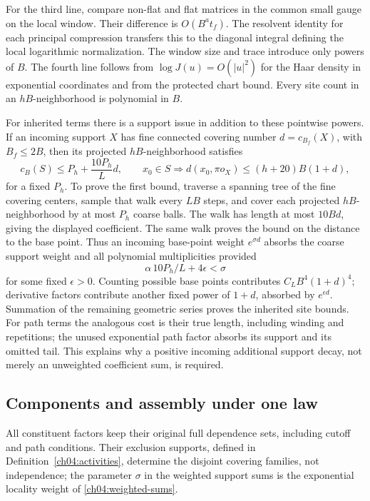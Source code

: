 For the third line, compare non-flat and flat matrices in the common
small gauge on the local window. Their difference is $O(B^a t_f)$.
The resolvent identity for each principal compression transfers this
to the diagonal integral defining the local logarithmic normalization.
The window size and trace introduce only powers of $B$.
The fourth line follows from $\log J(u)=O(|u|^2)$ for the Haar density
in exponential coordinates and from the protected chart bound.
Every site count in an $hB$-neighborhood is polynomial in $B$.

For inherited terms there is a support issue in addition to these
pointwise powers. If an incoming support $X$ has fine connected covering number
$d=c_{B_f}(X)$, with $B_f\le2B$, then its projected $hB$-neighborhood satisfies
\[
 c_B(S)\le P_h+\frac{10P_h}{L}d,\qquad
 x_0\in S\Longrightarrow
 d(x_0,\pi o_X)\le(h+20)B(1+d),
\]
for a fixed $P_h$. To prove the first bound, traverse a spanning tree
of the fine covering centers, sample that walk every $LB$ steps, and
cover each projected $hB$-neighborhood by at most $P_h$ coarse balls.
The walk has length at most $10Bd$, giving the displayed coefficient.
The same walk proves the bound on the distance to the base point. Thus an incoming
base-point weight $e^{\sigma d}$ absorbs the coarse support weight and all
polynomial multiplicities provided
\[
 \alpha\,10P_h/L+4\epsilon<\sigma
\]
for some fixed $\epsilon>0$. Counting possible base points contributes
$C_L B^4(1+d)^4$; derivative factors contribute another fixed power of
$1+d$, absorbed by $e^{\epsilon d}$. Summation of the remaining
geometric series proves the inherited site bounds.
For path terms the analogous cost is their true length, including
winding and repetitions; the unused exponential path factor absorbs its
support and its omitted tail. This explains why a positive incoming
additional support decay, not merely an unweighted coefficient sum, is required.

\subsection{Components and assembly under one law}

All constituent factors keep their original full dependence sets, including cutoff and path conditions. Their exclusion supports, defined in Definition~\ref{ch04:activities}, determine the disjoint covering families, not independence; the parameter $\sigma$ in the weighted support sums is the exponential locality weight of \eqref{ch04:weighted-sums}.

